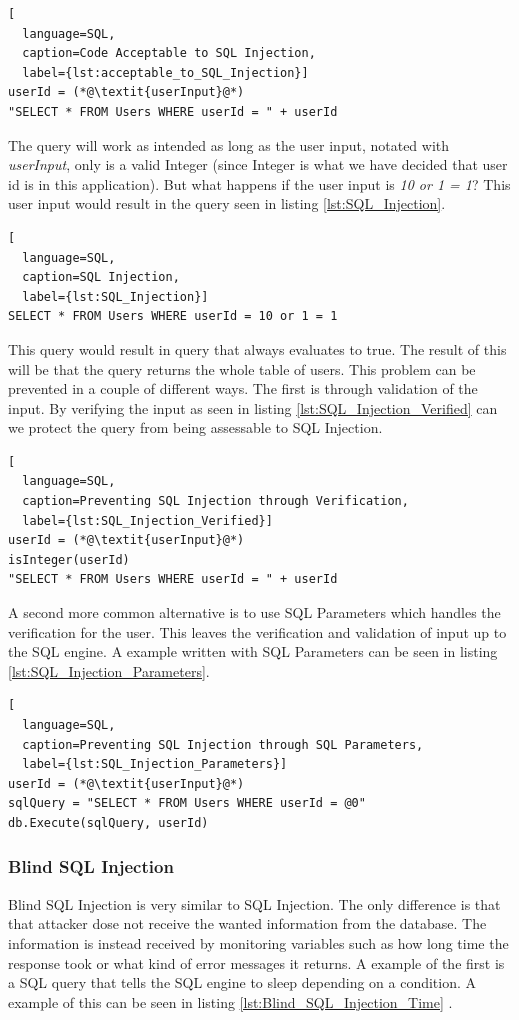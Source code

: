 \hfill
\begin{lstlisting}[
  language=SQL,
  caption=Code Acceptable to SQL Injection,
  label={lst:acceptable_to_SQL_Injection}]
userId = (*@\textit{userInput}@*)
"SELECT * FROM Users WHERE userId = " + userId
\end{lstlisting}
\hfill

The query will work as intended as long as the user input, notated with \textit{userInput}, only is a valid Integer (since Integer is what we have decided that user id is in this application). But what happens if the user input is \textit{10 or 1 = 1}? This user input would result in the query seen in listing \ref{lst:SQL_Injection}.

\hfill
\begin{lstlisting}[
  language=SQL,
  caption=SQL Injection,
  label={lst:SQL_Injection}]
SELECT * FROM Users WHERE userId = 10 or 1 = 1
\end{lstlisting}
\hfill

This query would result in query that always evaluates to true. The result of this will be that the query returns the whole table of users. This problem can be prevented in a couple of different ways. The first is through validation of the input. By verifying the input as seen in listing \ref{lst:SQL_Injection_Verified} can we protect the query from being assessable to SQL Injection.

\hfill
\begin{lstlisting}[
  language=SQL,
  caption=Preventing SQL Injection through Verification,
  label={lst:SQL_Injection_Verified}]
userId = (*@\textit{userInput}@*)
isInteger(userId)
"SELECT * FROM Users WHERE userId = " + userId
\end{lstlisting}
\hfill

A second more common alternative is to use SQL Parameters which handles the verification for the user. This leaves the verification and validation of input up to the SQL engine. A example written with SQL Parameters can be seen in listing \ref{lst:SQL_Injection_Parameters}.

\hfill
\begin{lstlisting}[
  language=SQL,
  caption=Preventing SQL Injection through SQL Parameters,
  label={lst:SQL_Injection_Parameters}]
userId = (*@\textit{userInput}@*)
sqlQuery = "SELECT * FROM Users WHERE userId = @0"
db.Execute(sqlQuery, userId)
\end{lstlisting}


\subsubsection{Blind SQL Injection}
Blind SQL Injection is very similar to SQL Injection. The only difference is that that attacker dose not receive the wanted information from the database. The information is instead received by monitoring variables such as how long time the response took or what kind of error messages it returns. A example of the first is a SQL query that tells the SQL engine to sleep depending on a condition. A example of this can be seen in listing \ref{lst:Blind_SQL_Injection_Time} \parencite{JustinClarke-Salt2009SIAa, Secure_Web}.


